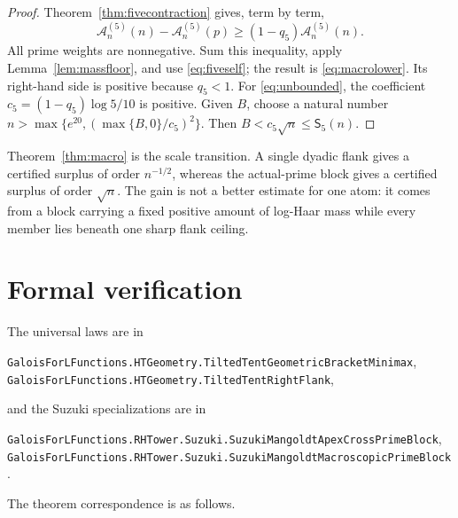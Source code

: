 \documentclass[11pt]{article}
\newcommand{\A}{\mathcal A}
\newcommand{\Sur}{\mathsf S}
\begin{document}
\begin{proof}
Theorem~\ref{thm:fivecontraction} gives, term by term,
\[
 \A_n^{(5)}(n)-\A_n^{(5)}(p)
 \ge(1-q_5)\A_n^{(5)}(n).
\]
All prime weights are nonnegative.  Sum this inequality, apply
Lemma~\ref{lem:massfloor}, and use \eqref{eq:fiveself}; the result is
\eqref{eq:macrolower}.  Its right-hand side is positive because $q_5<1$.
For \eqref{eq:unbounded}, the coefficient
$c_5=(1-q_5)\log5/10$ is positive.  Given $B$, choose a natural number
$n>\max\{e^{20},(\max\{B,0\}/c_5)^2\}$.  Then
$B<c_5\sqrt n\le\Sur_5(n)$.
\end{proof}

Theorem~\ref{thm:macro} is the scale transition.  A single dyadic flank gives a certified surplus
of order $n^{-1/2}$, whereas the actual-prime block gives a certified surplus of order $\sqrt n$.
The gain is not a better estimate for one atom: it comes from a block carrying a fixed positive
amount of log-Haar mass while every member lies beneath one sharp flank ceiling.

\section{Formal verification}\label{sec:formal}\leavevmode\par

The universal laws are in
\begin{center}
\small\nolinkurl{GaloisForLFunctions.HTGeometry.TiltedTentGeometricBracketMinimax},\\
\small\nolinkurl{GaloisForLFunctions.HTGeometry.TiltedTentRightFlank},
\end{center}
and the Suzuki specializations are in
\begin{center}
\small\nolinkurl{GaloisForLFunctions.RHTower.Suzuki.SuzukiMangoldtApexCrossPrimeBlock},\\
\small\nolinkurl{GaloisForLFunctions.RHTower.Suzuki.SuzukiMangoldtMacroscopicPrimeBlock}.
\end{center}
The theorem correspondence is as follows.
\end{document}
